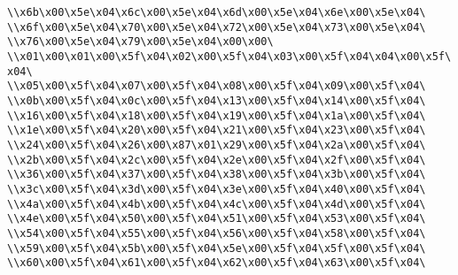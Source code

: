 \verb|\\x6b\x00\x5e\x04\x6c\x00\x5e\x04\x6d\x00\x5e\x04\x6e\x00\x5e\x04\|\newline
\verb|\\x6f\x00\x5e\x04\x70\x00\x5e\x04\x72\x00\x5e\x04\x73\x00\x5e\x04\|\newline
\verb|\\x76\x00\x5e\x04\x79\x00\x5e\x04\x00\x00\|\newline
\verb|\\x01\x00\x01\x00\x5f\x04\x02\x00\x5f\x04\x03\x00\x5f\x04\x04\x00\x5f\x04\|\newline
\verb|\\x05\x00\x5f\x04\x07\x00\x5f\x04\x08\x00\x5f\x04\x09\x00\x5f\x04\|\newline
\verb|\\x0b\x00\x5f\x04\x0c\x00\x5f\x04\x13\x00\x5f\x04\x14\x00\x5f\x04\|\newline
\verb|\\x16\x00\x5f\x04\x18\x00\x5f\x04\x19\x00\x5f\x04\x1a\x00\x5f\x04\|\newline
\verb|\\x1e\x00\x5f\x04\x20\x00\x5f\x04\x21\x00\x5f\x04\x23\x00\x5f\x04\|\newline
\verb|\\x24\x00\x5f\x04\x26\x00\x87\x01\x29\x00\x5f\x04\x2a\x00\x5f\x04\|\newline
\verb|\\x2b\x00\x5f\x04\x2c\x00\x5f\x04\x2e\x00\x5f\x04\x2f\x00\x5f\x04\|\newline
\verb|\\x36\x00\x5f\x04\x37\x00\x5f\x04\x38\x00\x5f\x04\x3b\x00\x5f\x04\|\newline
\verb|\\x3c\x00\x5f\x04\x3d\x00\x5f\x04\x3e\x00\x5f\x04\x40\x00\x5f\x04\|\newline
\verb|\\x4a\x00\x5f\x04\x4b\x00\x5f\x04\x4c\x00\x5f\x04\x4d\x00\x5f\x04\|\newline
\verb|\\x4e\x00\x5f\x04\x50\x00\x5f\x04\x51\x00\x5f\x04\x53\x00\x5f\x04\|\newline
\verb|\\x54\x00\x5f\x04\x55\x00\x5f\x04\x56\x00\x5f\x04\x58\x00\x5f\x04\|\newline
\verb|\\x59\x00\x5f\x04\x5b\x00\x5f\x04\x5e\x00\x5f\x04\x5f\x00\x5f\x04\|\newline
\verb|\\x60\x00\x5f\x04\x61\x00\x5f\x04\x62\x00\x5f\x04\x63\x00\x5f\x04\|\newline
